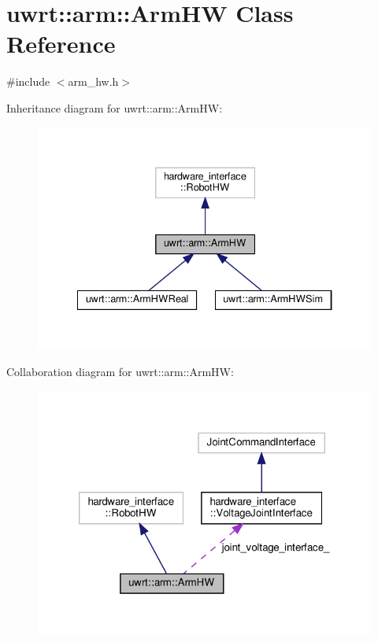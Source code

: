 \hypertarget{classuwrt_1_1arm_1_1_arm_h_w}{}\section{uwrt\+:\+:arm\+:\+:Arm\+HW Class Reference}
\label{classuwrt_1_1arm_1_1_arm_h_w}


{\ttfamily \#include $<$arm\+\_\+hw.\+h$>$}



Inheritance diagram for uwrt\+:\+:arm\+:\+:Arm\+HW\+:
\nopagebreak
\begin{figure}[H]
\begin{center}
\leavevmode
\includegraphics[width=334pt]{classuwrt_1_1arm_1_1_arm_h_w__inherit__graph}
\end{center}
\end{figure}


Collaboration diagram for uwrt\+:\+:arm\+:\+:Arm\+HW\+:
\nopagebreak
\begin{figure}[H]
\begin{center}
\leavevmode
\includegraphics[width=320pt]{classuwrt_1_1arm_1_1_arm_h_w__coll__graph}
\end{center}
\end{figure}
